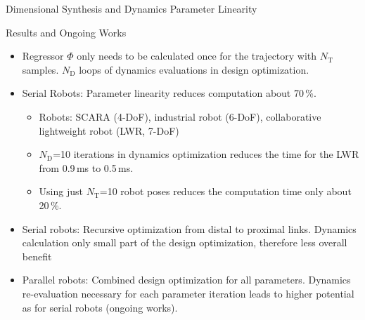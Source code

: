 \documentclass[c]{beamer}
\newcommand{\postersubsection}[1]{%
\setlength\fboxsep{0pt}%
\vfil\penalty125\vfilneg\vskip1.5ex
\colorbox{Grau}{\parbox[b]{\columnwidth}{\vskip0.75ex%
\Large\hskip1ex #1%
\vskip0.75ex}}%
}
\begin{document}
\begin{frame}
\begin{whiteblock}{Dimensional Synthesis and Dynamics Parameter Linearity}
{\begin{multicols}{2}
\end{multicols}}
\end{whiteblock}
\begin{block}{Results and Ongoing Works}
\parbox{\columnwidth}{
\begin{multicols}{2}
[]
\begin{itemize}
    \item Regressor $\bm{\varPhi}$ only needs to be calculated once for the trajectory with $N_\mathrm{T}$ samples. $N_\mathrm{D}$ loops of dynamics evaluations in design optimization.
    \item Serial Robots: Parameter linearity reduces computation about 70\,\%.
    \begin{itemize}
        \item Robots: SCARA (4-DoF), industrial robot (6-DoF), collaborative lightweight robot (LWR, 7-DoF)
        \item $N_\mathrm{D}$=10 iterations in dynamics optimization reduces the time for the LWR from 0.9\,ms to 0.5\,ms.
        \item Using just $N_\mathrm{T}$=10 robot poses reduces the computation time only about 20\,\%.
    \end{itemize}
    \item Serial robots: Recursive optimization from distal to proximal links. Dynamics calculation only small part of the design optimization, therefore less overall benefit 
    \item Parallel robots: Combined design optimization for all parameters. Dynamics re-evaluation necessary for each parameter iteration leads to higher potential as for serial robots (ongoing works).
\end{itemize}

%    


\begin{figure}[t]
    \centering
    
\end{figure}


\end{multicols}}
\end{block}
\end{frame}
\end{document}
